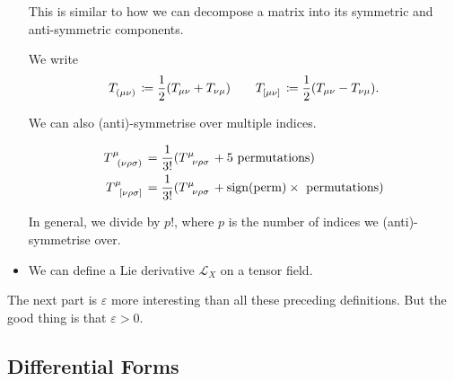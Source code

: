 \begin{itemize}
\begin{equation}
    \end{equation}
    \begin{leftbar}
      \begin{remark}
        This is similar to how we can decompose a matrix into its symmetric and anti-symmetric components.
      \end{remark}
    \end{leftbar}
    \begin{notation}[]
      We write 
      \begin{equation}
	T \indices{_{(\mu \nu)}} \coloneqq \frac{1}{2} (T_{\mu\nu} + T_{\nu \mu}) \qquad
	T \indices{_{[\mu \nu]}} \coloneqq \frac{1}{2} (T_{\mu\nu} - T_{\nu \mu}).
      \end{equation}
    \end{notation}
    We can also (anti)-symmetrise over multiple indices.
    \begin{example}[]
      \begin{align}
	T \indices{^\mu_{(\nu\rho\sigma)}} &= \frac{1}{3!} (T \indices{^\mu_{\nu\rho\sigma}} + 5 \text{ permutations}) \\
      T \indices{^\mu_{[\nu\rho\sigma]}} &= \frac{1}{3!} (T \indices{^\mu_{\nu\rho\sigma}} + \text{sign(perm)} \times \text{ permutations}) \\
      \end{align}
    \end{example}
    In general, we divide by $p!$, where $p$ is the number of indices we (anti)-symmetrise over.
  \item We can define a Lie derivative $\mathcal{L}_X$ on a tensor field.
\end{itemize}

The next part is $\varepsilon$ more interesting than all these preceding definitions. But the good thing is that $\varepsilon > 0$.

\subsection{Differential Forms}%
\label{sub:differential_forms}

